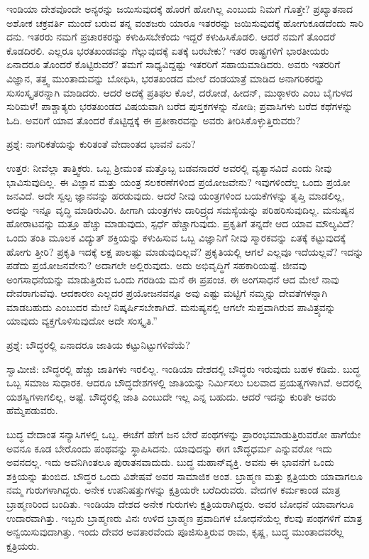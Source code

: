 ಇಂಡಿಯಾ ದೇಶವೊಂದೇ ಅನ್ಯರನ್ನು ಜಯಿಸುವುದಕ್ಕೆ ಹೊರಗೆ ಹೋಗಿಲ್ಲ ಎಂಬುದು ನಿಮಗೆ ಗೊತ್ತೇ? ಪ್ರಖ್ಯಾತನಾದ ಅಶೋಕ ಚಕ್ರವರ್ತಿ ಮುಂದೆ ಬರುವ ತನ್ನ ವಂಶಜರು ಯಾರೂ ಇತರರನ್ನು ಜಯಿಸುವುದಕ್ಕೆ ಹೋಗುಕೂಡದೆಂದು ಸಾರಿ ದನು. ಇತರರು ನಮಗೆ ಪ್ರಚಾರಕರನ್ನು ಕಳುಹಿಸಬೇಕೆಂದು ಇದ್ದರೆ ಕಳುಹಿಸಿಕೊಡಲಿ. ಆದರೆ ನಮಗೆ ತೊಂದರೆ ಕೊಡದಿರಲಿ. ಎಲ್ಲರೂ ಭರತಖಂಡವನ್ನು ಗೆಲ್ಲುವುದಕ್ಕೆ ಏತಕ್ಕೆ ಬರಬೇಕು? ಇತರ ರಾಷ್ಟ್ರಗಳಿಗೆ ಭಾರತೀಯರು ಏನಾದರೂ ತೊಂದರೆ ಕೊಟ್ಟಿರುವರೆ? ತಮಗೆ ಸಾಧ್ಯವಿದ್ದಷ್ಟು ಇತರರಿಗೆ ಸಹಾಯಮಾಡಿದರು. ಅವರು ಇತರರಿಗೆ ವಿಜ್ಞಾನ, ತತ್ತ್ವ ಮುಂತಾದುವನ್ನು ಬೋಧಿಸಿ, ಭರತಖಂಡದ ಮೇಲೆ ದಂಡಯಾತ್ರೆ ಮಾಡಿದ ಅನಾಗರಿಕರನ್ನು ಸುಸಂಸ್ಕೃತರನ್ನಾಗಿ ಮಾಡಿದರು. ಆದರೆ ಅದಕ್ಕೆ ಪ್ರತಿಫಲ ಕೊಲೆ, ದರೋಡೆ, ಹೀದನ್​, ಮುಠ್ಠಾಳರು ಎಂಬ ಬೈಗುಳದ ಸುರಿಮಳೆ! ಪಾಶ್ಚಾತ್ಯರು ಭರತಖಂಡದ ವಿಷಯವಾಗಿ ಬರೆದ ಪುಸ್ತಕಗಳನ್ನು ನೋಡಿ; ಪ್ರವಾಸಿಗಳು ಬರೆದ ಕಥೆಗಳನ್ನು ಓದಿ. ಅವರಿಗೆ ಯಾವ ತೊಂದರೆ ಕೊಟ್ಟಿದ್ದಕ್ಕೆ ಈ ಪ್ರತೀಕಾರವನ್ನು ಅವರು ತೀರಿಸಿಕೊಳ್ಳುತ್ತಿರುವರು?

ಪ್ರಶ್ನೆ: ನಾಗರಿಕತೆಯನ್ನು ಕುರಿತಂತೆ ವೇದಾಂತದ ಭಾವನೆ ಏನು?

ಉತ್ತರ: ನೀವೆಲ್ಲಾ ತಾತ್ತ್ವಿಕರು. ಒಬ್ಬ ಶ‍್ರೀಮಂತ ಮತ್ತೊಬ್ಬ ಬಡವನಾದರೆ ಅವರಲ್ಲಿ ವ್ಯತ್ಯಾಸವಿದೆ ಎಂದು ನೀವು ಭಾವಿಸುವುದಿಲ್ಲ. ಈ ವಿಜ್ಞಾನ ಮತ್ತು ಯಂತ್ರ ಸಲಕರಣೆಗಳಿಂದ ಪ್ರಯೋಜವೇನು? ಇವುಗಳಿಂದೆಲ್ಲ ಒಂದು ಪ್ರಯೋ ಜನವಿದೆ. ಅದೇ ಸ್ವಲ್ಪ ಜ್ಞಾನವನ್ನು ಹರಡುವುದು. ಆದರೆ ನೀವು ಯಂತ್ರಗಳಿಂದ ಬಯಕೆಗಳನ್ನು ತೃಪ್ತಿ ಮಾಡಲಿಲ್ಲ, ಅದನ್ನು ಇನ್ನೂ ವೃದ್ಧಿ ಮಾಡಿರುವಿರಿ. ಹೀಗಾಗಿ ಯಂತ್ರಗಳು ದಾರಿದ್ರ್ಯದ ಸಮಸ್ಯೆಯನ್ನು ಪರಿಹರಿಸುವುದಿಲ್ಲ. ಮನುಷ್ಯನ ಹೋರಾಟವನ್ನು ಮತ್ತೂ ಹೆಚ್ಚು ಮಾಡುವುದು, ಸ್ಪರ್ಧೆ ಹೆಚ್ಚಾಗುವುದು. ಪ್ರಕೃತಿಗೆ ತನ್ನದೇ ಆದ ಯಾವ ಮೌಲ್ಯವಿದೆ? ಒಂದು ತಂತಿ ಮೂಲಕ ವಿದ್ಯುತ್​ ಶಕ್ತಿಯನ್ನು ಕಳುಹಿಸುವ ಒಬ್ಬ ವಿಜ್ಞಾನಿಗೆ ನೀವು ಸ್ಮಾರಕವನ್ನು ಏತಕ್ಕೆ ಕಟ್ಟುವುದಕ್ಕೆ ಹೋಗು ತ್ತೀರಿ? ಪ್ರಕೃತಿ ಇದಕ್ಕೆ ಲಕ್ಷ ಪಾಲಷ್ಟು ಮಾಡುವುದಿಲ್ಲವೆ? ಪ್ರಕೃತಿಯಲ್ಲಿ ಆಗಲೆ ಎಲ್ಲವೂ ಇದೆಯಲ್ಲವೆ? ಇದನ್ನು ಪಡೆದು ಪ್ರಯೋಜನವೇನು? ಅದಾಗಲೇ ಅಲ್ಲಿರುವುದು. ಅದು ಅಭಿವೃದ್ಧಿಗೆ ಸಹಕಾರಿಯಷ್ಟೆ. ಜೀವವು ಅಂಗಸಾಧನೆಯನ್ನು ಮಾಡುತ್ತಿರುವ ಒಂದು ಗರಡಿಯ ಮನೆ ಈ ಪ್ರಪಂಚ. ಈ ಅಂಗಸಾಧನೆ ಆದ ಮೇಲೆ ನಾವು ದೇವರಾಗುವೆವು. ಆದಕಾರಣ ಎಲ್ಲದರ ಪ್ರಯೋಜನವನ್ನೂ ಅವು ಎಷ್ಟು ಮಟ್ಟಿಗೆ ನಮ್ಮನ್ನು ದೇವತೆಗಳನ್ನಾಗಿ ಮಾಡಬಹುದು ಎಂಬುದರ ಮೇಲೆ ನಿಷ್ಕರ್ಷಿಸಬೇಕಾಗಿದೆ. ಮನುಷ್ಯನಲ್ಲಿ ಆಗಲೇ ಸುಪ್ತವಾಗಿರುವ ಪಾವಿತ್ರ್ಯವನ್ನು ಯಾವುದು ವ್ಯಕ್ತಗೊಳಿಸುವುದೋ ಅದೇ ಸಂಸ್ಕೃತಿ.”

ಪ್ರಶ್ನೆ: ಬೌದ್ಧರಲ್ಲಿ ಏನಾದರೂ ಜಾತಿಯ ಕಟ್ಟುನಿಟ್ಟುಗಳಿವೆಯೆ?

ಸ್ವಾಮೀಜಿ: ಬೌದ್ಧರಲ್ಲಿ ಹೆಚ್ಚು ಜಾತಿಗಳು ಇರಲಿಲ್ಲ. ಇಂಡಿಯಾ ದೇಶದಲ್ಲಿ ಬೌದ್ಧರು ಇರುವುದು ಬಹಳ ಕಡಿಮೆ. ಬುದ್ಧ ಒಬ್ಬ ಸಮಾಜ ಸುಧಾರಕ. ಆದರೂ ಬೌದ್ಧದೇಶಗಳಲ್ಲಿ ಜಾತಿಯನ್ನು ನಿರ್ಮಿಸಲು ಬಲವಾದ ಪ್ರಯತ್ನಗಳಾಗಿವೆ. ಅದರಲ್ಲಿ ಯಶಸ್ವಿಗಳಾಗಲಿಲ್ಲ, ಅಷ್ಟೆ. ಬೌದ್ಧರಲ್ಲಿ ಜಾತಿ ಎಂಬುದೇ ಇಲ್ಲ ಎನ್ನ ಬಹುದು. ಆದರೆ ಇದನ್ನು ಕುರಿತೇ ಅವರು ಹೆಮ್ಮೆಪಡುವರು.

ಬುದ್ಧ ವೇದಾಂತ ಸನ್ಯಾಸಿಗಳಲ್ಲಿ ಒಬ್ಬ. ಈಚೆಗೆ ಹೇಗೆ ಜನ ಬೇರೆ ಪಂಥಗಳನ್ನು ಪ್ರಾರಂಭಮಾಡುತ್ತಿರುವರೋ ಹಾಗೆಯೇ ಅವನೂ ಕೂಡ ಬೇರೊಂದು ಪಂಥವನ್ನು ಸ್ಥಾಪಿಸಿದನು. ಯಾವುದನ್ನು ಈಗ ಬೌದ್ಧಧರ್ಮ ಎನ್ನುವರೋ ಇದು ಅವನದಲ್ಲ. ಇದು ಅವನಿಗಿಂತಲೂ ಪುರಾತನವಾದುದು. ಬುದ್ಧ ಮಹಾನ್​ವ್ಯಕ್ತಿ. ಅವನು ಈ ಭಾವನೆಗೆ ಒಂದು ಶಕ್ತಿಯನ್ನು ತುಂಬಿದ. ಬೌದ್ಧರ ಒಂದು ವಿಶೇಷವೆ ಅವರ ಸಾಮಾಜಿಕ ಅಂಶ. ಬ್ರಾಹ್ಮಣ ಮತ್ತು ಕ್ಷತ್ರಿಯರು ಯಾವಾಗಲೂ ನಮ್ಮ ಗುರುಗಳಾಗಿದ್ದರು. ಅನೇಕ ಉಪನಿಷತ್ತುಗಳನ್ನು ಕ್ಷತ್ರಿಯರೇ ಬರೆದಿರುವರು. ವೇದಗಳ ಕರ್ಮಕಾಂಡ ಮಾತ್ರ ಬ್ರಾಹ್ಮಣರಿಂದ ಬಂದಿತು. ಇಂಡಿಯಾ ದೇಶದ ಅನೇಕ ಗುರುಗಳು ಕ್ಷತ್ರಿಯರಾಗಿದ್ದರು. ಅವರ ಬೋಧನೆ ಯಾವಾಗಲೂ ಉದಾರವಾಗಿತ್ತು. ಇಬ್ಬರು ಬ್ರಾಹ್ಮಣರು ವಿನಃ ಉಳಿದ ಬ್ರಾಹ್ಮಣ ಪ್ರವಾದಿಗಳ ಬೋಧನೆಯೆಲ್ಲ ಕೆಲವು ಪಂಥಗಳಿಗೆ ಮಾತ್ರ ಅನ್ವಯಿಸುವುದಾಗಿತ್ತು. ಇಂದು ದೇವರ ಅವತಾರವೆಂದು ಪೂಜಿಸುತ್ತಿರುವ ರಾಮ, ಕೃಷ್ಣ, ಬುದ್ಧ ಮುಂತಾದವರೆಲ್ಲ ಕ್ಷತ್ರಿಯರು.

